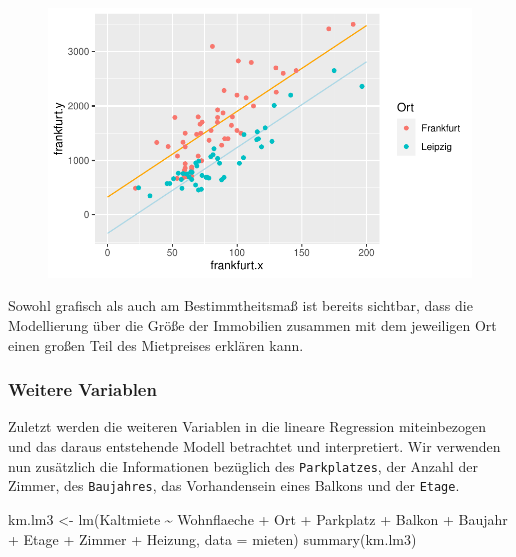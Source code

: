 \documentclass[
  a4paper,
  DIV=11]{scrartcl}
\newenvironment{Shaded}{\begin{snugshade}}{\end{snugshade}}
\newcommand{\AttributeTok}[1]{\textcolor[rgb]{0.40,0.45,0.13}{#1}}
\newcommand{\FunctionTok}[1]{\textcolor[rgb]{0.28,0.35,0.67}{#1}}
\newcommand{\NormalTok}[1]{\textcolor[rgb]{0.00,0.23,0.31}{#1}}
\newcommand{\OtherTok}[1]{\textcolor[rgb]{0.00,0.23,0.31}{#1}}
\newcommand{\SpecialCharTok}[1]{\textcolor[rgb]{0.37,0.37,0.37}{#1}}
\begin{document}
\begin{figure}[H]

{\centering \includegraphics{Mietmodellierung_files/figure-pdf/unnamed-chunk-22-1.pdf}

}

\end{figure}

Sowohl grafisch als auch am Bestimmtheitsmaß ist bereits sichtbar, dass
die Modellierung über die Größe der Immobilien zusammen mit dem
jeweiligen Ort einen großen Teil des Mietpreises erklären kann.

\hypertarget{weitere-variablen}{%
\subsubsection{Weitere Variablen}\label{weitere-variablen}}

Zuletzt werden die weiteren Variablen in die lineare Regression
miteinbezogen und das daraus entstehende Modell betrachtet und
interpretiert. Wir verwenden nun zusätzlich die Informationen bezüglich
des \texttt{Parkplatzes}, der Anzahl der Zimmer, des \texttt{Baujahres},
das Vorhandensein eines Balkons und der \texttt{Etage}.

\begin{Shaded}
\begin{Highlighting}[]
\NormalTok{km.lm3 }\OtherTok{\textless{}{-}} \FunctionTok{lm}\NormalTok{(Kaltmiete }\SpecialCharTok{\textasciitilde{}}\NormalTok{ Wohnflaeche }\SpecialCharTok{+}\NormalTok{ Ort }\SpecialCharTok{+}\NormalTok{ Parkplatz }\SpecialCharTok{+}\NormalTok{ Balkon }\SpecialCharTok{+}\NormalTok{ Baujahr }\SpecialCharTok{+}\NormalTok{ Etage }\SpecialCharTok{+}\NormalTok{ Zimmer }\SpecialCharTok{+}\NormalTok{ Heizung, }\AttributeTok{data =}\NormalTok{ mieten)}
\FunctionTok{summary}\NormalTok{(km.lm3)}
\end{Highlighting}
\end{Shaded}
\end{document}
